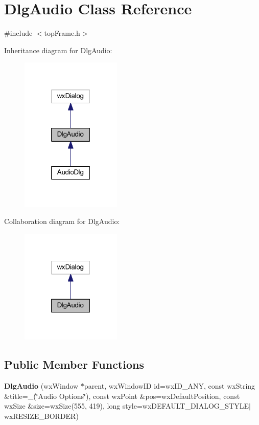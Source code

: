 \hypertarget{class_dlg_audio}{\section{Dlg\-Audio Class Reference}
\label{class_dlg_audio}
}


{\ttfamily \#include $<$top\-Frame.\-h$>$}



Inheritance diagram for Dlg\-Audio\-:\nopagebreak
\begin{figure}[H]
\begin{center}
\leavevmode
\includegraphics[width=136pt]{class_dlg_audio__inherit__graph}
\end{center}
\end{figure}


Collaboration diagram for Dlg\-Audio\-:\nopagebreak
\begin{figure}[H]
\begin{center}
\leavevmode
\includegraphics[width=136pt]{class_dlg_audio__coll__graph}
\end{center}
\end{figure}
\subsection*{Public Member Functions}
\begin{DoxyCompactItemize}
\item 
\hypertarget{class_dlg_audio_a95fa3d4e8550bf2a16b8562c9c518eae}{{\bfseries Dlg\-Audio} (wx\-Window $\ast$parent, wx\-Window\-I\-D id=wx\-I\-D\-\_\-\-A\-N\-Y, const wx\-String \&title=\-\_\-(\char`\"{}Audio Options\char`\"{}), const wx\-Point \&pos=wx\-Default\-Position, const wx\-Size \&size=wx\-Size(555, 419), long style=wx\-D\-E\-F\-A\-U\-L\-T\-\_\-\-D\-I\-A\-L\-O\-G\-\_\-\-S\-T\-Y\-L\-E$|$wx\-R\-E\-S\-I\-Z\-E\-\_\-\-B\-O\-R\-D\-E\-R)}\label{class_dlg_audio_a95fa3d4e8550bf2a16b8562c9c518eae}

\end{DoxyCompactItemize}
